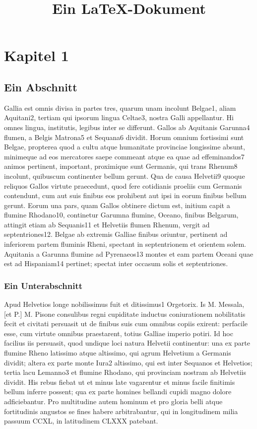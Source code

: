 

\title{Ein LaTeX-Dokument}

\chapter{Kapitel 1}

\section{Ein Abschnitt}

Gallia est omnis divisa in partes tres, quarum unam incolunt Belgae1, aliam
Aquitani2, tertiam qui ipsorum lingua Celtae3, nostra Galli appellantur. Hi
omnes lingua, institutis, legibus inter se differunt. Gallos ab Aquitanis
Garunna4 flumen, a Belgis Matrona5 et Sequana6 dividit. Horum omnium fortissimi
sunt Belgae, propterea quod a cultu atque humanitate provinciae longissime
absunt, minimeque ad eos mercatores saepe commeant atque ea quae ad
effeminandos7 animos pertinent, important, proximique sunt Germanis, qui trans
Rhenum8 incolunt, quibuscum continenter bellum gerunt. Qua de causa Helvetii9
quoque reliquos Gallos virtute praecedunt, quod fere cotidianis proeliis cum
Germanis contendunt, cum aut suis finibus eos prohibent aut ipsi in eorum
finibus bellum gerunt. Eorum una pars, quam Gallos obtinere dictum est, initium
capit a flumine Rhodano10, continetur Garumna flumine, Oceano, finibus Belgarum,
attingit etiam ab Sequanis11 et Helvetiis flumen Rhenum, vergit ad
septentriones12. Belgae ab extremis Galliae finibus oriuntur, pertinent ad
inferiorem partem fluminis Rheni, spectant in septentrionem et orientem solem.
Aquitania a Garunna flumine ad Pyrenaeos13 montes et eam partem Oceani quae est
ad Hispaniam14 pertinet; spectat inter occasum solis et septentriones. 

\subsection{Ein Unterabschnitt}

Apud Helvetios longe nobilissimus fuit et ditissimus1 Orgetorix. Is M. Messala,
[et P.] M. Pisone consulibus regni cupiditate inductus coniurationem nobilitatis
fecit et civitati persuasit ut de finibus suis cum omnibus copiis exirent:
perfacile esse, cum virtute omnibus praestarent, totius Galliae imperio potiri.
Id hoc facilius iis persuasit, quod undique loci natura Helvetii continentur:
una ex parte flumine Rheno latissimo atque altissimo, qui agrum Helvetium a
Germanis dividit; altera ex parte monte Iura2 altissimo, qui est inter Sequanos
et Helvetios; tertia lacu Lemanno3 et flumine Rhodano, qui provinciam nostram ab
Helvetiis dividit. His rebus fiebat ut et minus late vagarentur et minus facile
finitimis bellum inferre possent; qua ex parte homines bellandi cupidi magno
dolore adficiebantur. Pro multitudine autem hominum et pro gloria belli atque
fortitudinis angustos se fines habere arbitrabantur, qui in longitudinem milia
passuum CCXL, in latitudinem CLXXX patebant.

